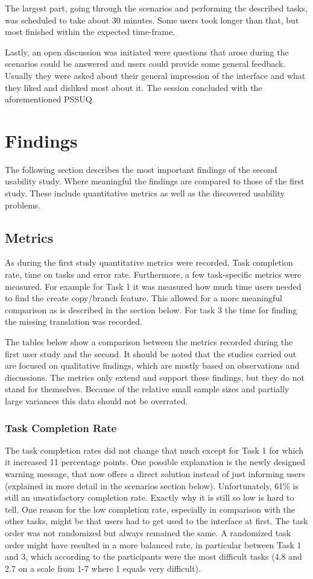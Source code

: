 The largest part, going through the scenarios and performing the described tasks, was scheduled to take about 30 minutes. Some users took longer than that, but most finished within the expected time-frame.

Lastly, an open discussion was initiated were questions that arose during the scenarios could be answered and users could provide some general feedback. Usually they were asked about their general impression of the interface and what they liked and disliked most about it. The session concluded with the aforementioned PSSUQ.

\section{Findings}
The following section describes the most important findings of the second usability study. Where meaningful the findings are compared to those of the first study. These include quantitative metrics as well as the discovered usability problems.

\subsection{Metrics}
As during the first study quantitative metrics were recorded. Task completion rate, time on tasks and error rate. Furthermore, a few task-specific metrics were measured. For example for Task 1 it was measured how much time users needed to find the create copy/branch feature. This allowed for a more meaningful comparison as is described in the section below. For task 3 the time for finding the missing translation was recorded.

The tables below show a comparison between the metrics recorded during the first user study and the second. It should be noted that the studies carried out are focused on qualitative findings, which are mostly based on observations and discussions. The metrics only extend and support these findings, but they do not stand for themselves. Because of the relative small sample sizes and partially large variances this data should not be overrated.

\subsubsection{Task Completion Rate}
The task completion rates did not change that much except for Task 1 for which it increased 11 percentage points. One possible explanation is the newly designed warning message, that now offers a direct solution instead of just informing users (explained in more detail in the scenarios section below). Unfortunately, 61\% is still an unsatisfactory completion rate. Exactly why it is still so low is hard to tell. One reason for the low completion rate, especially in comparison with the other tasks, might be that users had to get used to the interface at first. The task order was not randomized but always remained the same. A randomized task order might have resulted in a more balanced rate, in particular between Task 1 and 3, which according to the participants were the most difficult tasks (4.8 and 2.7 on a scale from 1-7 where 1 equals very difficult).

